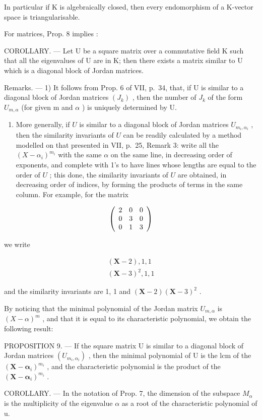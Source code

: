 In particular if K is algebraically closed, then every endomorphism of a K-vector space is triangularisable.

For matrices, Prop. 8 implies :

COROLLARY. --- Let U be a square matrix over a commutative field K such that all the eigenvalues of U are in K; then there exists a matrix similar to U which is a diagonal block of Jordan matrices.

Remarks. --- 1) It follows from Prop. 6 of VII, p.~34, that, if U is similar to a diagonal block of Jordan matrices \((J_{k})\) , then the number of \(J_{k}\) of the form \(U_{m,\alpha}\) (for given m and \(\alpha\) ) is uniquely determined by U.

\begin{enumerate}
\def\labelenumi{\arabic{enumi})}
\setcounter{enumi}{1}
\tightlist
\item
  More generally, if \(U\) is similar to a diagonal block of Jordan matrices \(U_{m_i,\alpha_i}\) , then the similarity invariants of \(U\) can be readily calculated by a method modelled on that presented in VII, p.~25, Remark 3: write all the \((X - \alpha_i)^{m_i}\) with the same \(\alpha\) on the same line, in decreasing order of exponents, and complete with 1's to have lines whose lengths are equal to the order of \(U\) ; this done, the similarity invariants of \(U\) are obtained, in decreasing order of indices, by forming the products of terms in the same column. For example, for the matrix
\end{enumerate}

\[
\left( \begin{array}{c c c} 2 & 0 & 0 \\ 0 & 3 & 0 \\ 0 & 1 & 3 \end{array} \right)
\]

we write

\[
\begin{array}{l} (\mathbf {X} - 2), 1, 1 \\ (\mathbf {X} - 3) ^ {2}, 1, 1 \end{array}
\]

and the similarity invariants are 1, 1 and \((\mathbf{X} - 2)(\mathbf{X} - 3)^2\) .

By noticing that the minimal polynomial of the Jordan matrix \(U_{m,\alpha}\) is \((X-\alpha)^{m}\) , and that it is equal to its characteristic polynomial, we obtain the following result:

PROPOSITION 9. --- If the square matrix U is similar to a diagonal block of Jordan matrices \((U_{m_{i},\alpha_{i}})\) , then the minimal polynomial of U is the lcm of the \((\mathbf{X}-\boldsymbol{\alpha}_{i})^{m_{i}}\) , and the characteristic polynomial is the product of the \((\mathbf{X}-\boldsymbol{\alpha}_{i})^{m_{i}}\) .

COROLLARY. --- In the notation of Prop. 7, the dimension of the subspace \(M_{\alpha}\) is the multiplicity of the eigenvalue \(\alpha\) as a root of the characteristic polynomial of u.

